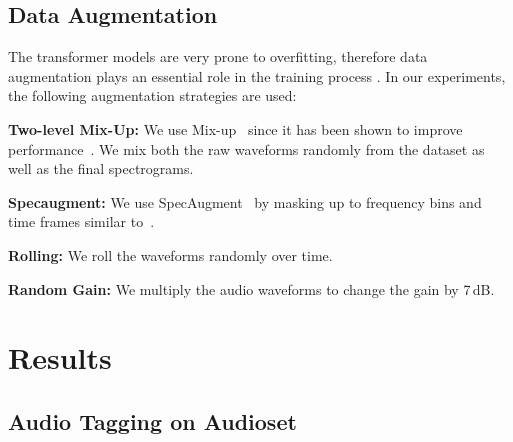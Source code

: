 \documentclass[a4paper]{article}
\begin{document}
\subsection{Data Augmentation}
\label{sec:augmentation}
The transformer models are very prone to overfitting, therefore data augmentation plays an essential role in the training process \cite{TouvronCDMSJ21deit}.
In our experiments, the following augmentation strategies are used:


 \textbf{Two-level Mix-Up:} We use Mix-up~\cite{zhangMixupEmpiricalRisk2017} since it has been shown to improve performance~\cite{koutini21journal,gong21ast}. We mix both the raw waveforms randomly from the dataset as well as the final spectrograms.

\textbf{Specaugment:} We use SpecAugment~\cite{ParkCZCZCL19Specaugment} by masking up to  frequency bins and  time frames similar to~\cite{gong21ast}.

 \textbf{Rolling:} We roll the waveforms randomly over time.

 \textbf{Random Gain:} We multiply the audio waveforms to change the gain by 7\,dB.


\section{Results}
\label{sec:results}

\subsection{Audio Tagging on Audioset}
\end{document}
